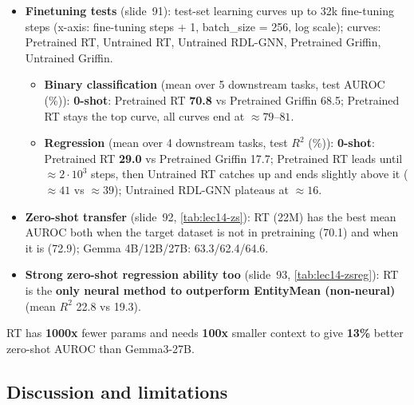 \begin{itemize}
  \item \textbf{Finetuning tests} (slide~91): test-set learning curves up to 32k
    fine-tuning steps (x-axis: fine-tuning steps + 1, batch\_size = 256, log scale);
    curves: Pretrained RT, Untrained RT, Untrained RDL-GNN, Pretrained Griffin, Untrained
    Griffin.
    \begin{itemize}
      \item \textbf{Binary classification} (mean over 5 downstream tasks, test AUROC (\%)):
        \textbf{0-shot}: Pretrained RT \textbf{70.8} vs Pretrained Griffin 68.5; Pretrained
        RT stays the top curve, all curves end at $\approx79$--$81$.
      \item \textbf{Regression} (mean over 4 downstream tasks, test $R^2$ (\%)):
        \textbf{0-shot}: Pretrained RT \textbf{29.0} vs Pretrained Griffin 17.7;
        Pretrained RT leads until $\approx2\cdot10^3$ steps, then Untrained RT catches up and
        ends slightly above it ($\approx41$ vs $\approx39$); Untrained RDL-GNN plateaus at
        $\approx16$.
    \end{itemize}
  \item \textbf{Zero-shot transfer} (slide~92, \cref{tab:lec14-zs}): RT (22M) has the best
    mean AUROC both when the target dataset is not in pretraining (70.1) and when it is
    (72.9); Gemma 4B/12B/27B: 63.3/62.4/64.6.
  \item \textbf{Strong zero-shot regression ability too} (slide~93,
    \cref{tab:lec14-zsreg}): RT is the \textbf{only neural method to outperform EntityMean
    (non-neural)} (mean $R^2$ 22.8 vs 19.3).
\end{itemize}

\begin{keyidea}[Slide 94]
  RT has \textbf{1000x} fewer params and needs \textbf{100x} smaller context to give
  \textbf{13\%} better zero-shot AUROC than Gemma3-27B.
\end{keyidea}

\subsection{Discussion and limitations}\label{sec:lec14-rt-disc}

